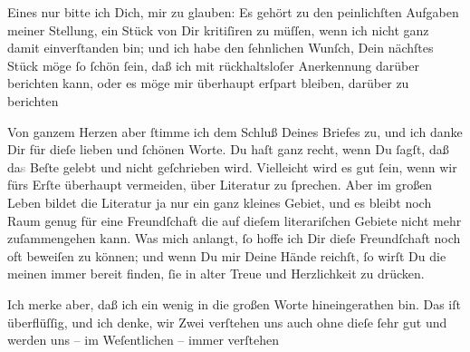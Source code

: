 \pstart
           Eines nur bitte ich Dich, mir zu glauben: Es gehört zu den peinlichſten Aufgaben
               meiner Stellung, ein Stück von Dir \strikeout{\textcolor{gray}{×}} kritiſiren zu müſſen, wenn ich nicht ganz damit einverſtanden bin; und ich
               habe den ſehnlichen Wunſch, Dein nächſtes Stück möge ſo ſchön ſein, daß ich mit
               rückhaltsloſer Anerkennung darüber berichten kann, oder es \strikeout{\textcolor{gray}{×}} möge mir überhaupt erſpart bleiben, darüber zu berichten{\dotsfive}\pend
           
\pstart
           Von ganzem Herzen  aber ſtimme ich dem Schluß Deines Briefes zu, und ich danke Dir für dieſe
               lieben {\pb}und ſchönen Worte. Du haſt ganz recht, wenn
               Du ſagſt, daß da\textcolor{gray}{s} Beſte gelebt und nicht geſchrieben wird.
               Vielleicht wird es gut ſein, wenn wir fürs Erſte überhaupt vermeiden, über Literatur
               zu ſprechen. Aber im großen Leben bildet die Literatur ja nur ein ganz kleines
               Gebiet, und es bleibt noch Raum genug für eine Freundſchaft die auf dieſem
               literariſchen Gebiete nicht mehr zuſammengehen kann. Was mich anlangt, ſo hoffe ich
               Dir dieſe Freundſchaft noch oft beweiſen zu können; und  wenn Du mir Deine Hände reichſt, ſo wirſt Du die meinen immer bereit
               finden, ſie \strikeout{\textcolor{gray}{×}\-\textcolor{gray}{×}\-\textcolor{gray}{×}} in alter Treue und Herzlichkeit zu drücken.\pend
           
\pstart
            Ich merke aber, daß ich ein wenig in die großen Worte hineingerathen bin. Das
               iſt überflüſſig, und ich denke, wir Zwei verſtehen uns {\pb}auch ohne dieſe ſehr gut und werden uns – im Weſentlichen – immer verſtehen{\dotsfour}\pend
           
